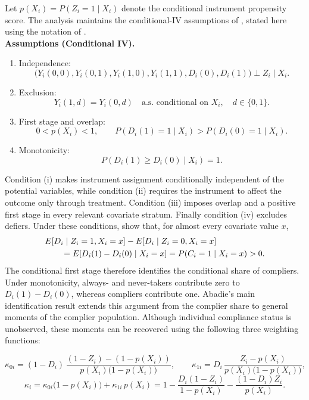 \documentclass[12pt, a4paper, oneside]{article}
\theoremstyle{plain}
\theoremstyle{definition}
\begin{document}
Let $p(X_i)=P(Z_i=1\mid X_i)$ denote the conditional instrument propensity score. The analysis maintains the conditional-IV assumptions of \citet[Assumption~2.1]{abadie2003semiparametric}, stated here using the notation of \citet[Assumption~IV]{sloczynski2025abadie}.\\
\textbf{Assumptions (Conditional IV).}
\begin{enumerate}
    \item[(i)] Independence:
    \[
    \big(Y_i(0,0),Y_i(0,1),Y_i(1,0),Y_i(1,1),D_i(0),D_i(1)\big)
    \perp Z_i \mid X_i.
    \]
    \item[(ii)] Exclusion:
    \[
    Y_i(1,d)=Y_i(0,d) \quad \text{a.s. conditional on } X_i,\quad d\in\{0,1\}.
    \]
    \item[(iii)] First stage and overlap:
    \[
    0<p(X_i)<1,\qquad
    P(D_i(1)=1\mid X_i)>P(D_i(0)=1\mid X_i).
    \]
    \item[(iv)] Monotonicity:
    \[
    P(D_i(1)\geq D_i(0)\mid X_i)=1.
    \]
\end{enumerate}
Condition (i) makes instrument assignment conditionally independent of the
potential variables, while condition (ii) requires the instrument to affect the
outcome only through treatment. Condition (iii) imposes overlap and a positive
first stage in every relevant covariate stratum. Finally condition (iv) excludes
defiers. Under these conditions, \citet[Lemma~2.1]{abadie2003semiparametric} show that, for almost every covariate value $x$,
\begin{align}
    &E[D_i\mid Z_i=1,X_i=x]-E[D_i\mid Z_i=0,X_i=x] \notag\\
    &\qquad=E[D_i(1)-D_i(0)\mid X_i=x]
    =P(C_i=1\mid X_i=x)>0.
    \label{eq:conditional_complier_share}
\end{align}
The conditional first stage therefore identifies the conditional share of compliers. Under monotonicity, always- and never-takers contribute zero to $D_i(1)-D_i(0)$, whereas compliers contribute one. Abadie's main identification result extends this argument from the complier share to general moments of the complier population. Although individual compliance status is unobserved, these moments can be recovered using the following three weighting functions:

\begin{equation}
    \kappa_{0i} = (1-D_i)\,\frac{(1-Z_i)-(1-p(X_i))}{p(X_i)\big(1-p(X_i)\big)}, \qquad
    \kappa_{1i} = D_i\,\frac{Z_i-p(X_i)}{p(X_i)\big(1-p(X_i)\big)},
\end{equation}
\begin{equation}
    \kappa_i = \kappa_{0i}\big(1-p(X_i)\big)+\kappa_{1i}\,p(X_i) = 1-\frac{D_i(1-Z_i)}{1-p(X_i)}-\frac{(1-D_i)Z_i}{p(X_i)}.
\end{equation}
\end{document}
